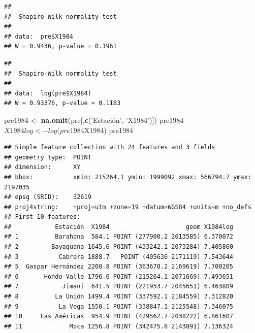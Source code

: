 \documentclass[11pt,]{article}
\newenvironment{Shaded}{\begin{snugshade}}{\end{snugshade}}
\newcommand{\KeywordTok}[1]{\textcolor[rgb]{0.13,0.29,0.53}{\textbf{#1}}}
\newcommand{\StringTok}[1]{\textcolor[rgb]{0.31,0.60,0.02}{#1}}
\newcommand{\OperatorTok}[1]{\textcolor[rgb]{0.81,0.36,0.00}{\textbf{#1}}}
\newcommand{\NormalTok}[1]{#1}
\begin{document}
\begin{Shaded}
\end{Shaded}

\begin{verbatim}
## 
##  Shapiro-Wilk normality test
## 
## data:  pre$X1984
## W = 0.9436, p-value = 0.1961
\end{verbatim}

\begin{Shaded}
\end{Shaded}

\begin{verbatim}
## 
##  Shapiro-Wilk normality test
## 
## data:  log(pre$X1984)
## W = 0.93376, p-value = 0.1183
\end{verbatim}

\begin{Shaded}
\begin{Highlighting}[]
\NormalTok{pre1984 <-}\StringTok{ }\KeywordTok{na.omit}\NormalTok{(pre[,}\KeywordTok{c}\NormalTok{(}\StringTok{'Estación', '}\NormalTok{X1984}\StringTok{')])}
\StringTok{pre1984$X1984log <- log(pre1984$X1984)}
\StringTok{pre1984}
\end{Highlighting}
\end{Shaded}

\begin{verbatim}
## Simple feature collection with 24 features and 3 fields
## geometry type:  POINT
## dimension:      XY
## bbox:           xmin: 215264.1 ymin: 1999092 xmax: 566794.7 ymax: 2197035
## epsg (SRID):    32619
## proj4string:    +proj=utm +zone=19 +datum=WGS84 +units=m +no_defs
## First 10 features:
##            Estación  X1984                     geom X1984log
## 1          Barahona  584.1 POINT (277900.2 2013585) 6.370072
## 2         Bayaguana 1645.6 POINT (433242.1 2073284) 7.405860
## 3           Cabrera 1888.7   POINT (405636 2171119) 7.543644
## 5  Gaspar Hernández 2208.8 POINT (363678.2 2169619) 7.700205
## 6       Hondo Valle 1796.6 POINT (215264.1 2071669) 7.493651
## 7            Jimaní  641.5 POINT (221953.7 2045651) 6.463809
## 8          La Unión 1499.4 POINT (337592.1 2184559) 7.312820
## 9           La Vega 1550.1 POINT (338847.1 2125548) 7.346075
## 10     Las Américas  954.9 POINT (429562.7 2038222) 6.861607
## 11             Moca 1256.8 POINT (342475.8 2143891) 7.136324
\end{verbatim}
\end{document}
